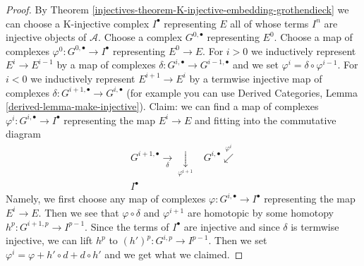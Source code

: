 \begin{proof}

By Theorem \ref{injectives-theorem-K-injective-embedding-grothendieck}
we can choose a K-injective complex $I^\bullet$
representing $E$ all of whose terms $I^n$ are injective
objects of $\mathcal{A}$.
Choose a complex $G^{0, \bullet}$ representing $E^0$.
Choose a map of complexes $\varphi^0 : G^{0, \bullet} \to I^\bullet$
representing $E^0 \to E$.
For $i > 0$ we inductively represent $E^i \to E^{i - 1}$
by a map of complexes
$\delta : G^{i, \bullet} \to G^{i - 1, \bullet}$
and we set $\varphi^i = \delta \circ \varphi^{i - 1}$.
For $i < 0$ we inductively represent $E^{i + 1} \to E^i$
by a termwise injective map of complexes
$\delta : G^{i + 1, \bullet} \to G^{i, \bullet}$
(for example you can use
Derived Categories, Lemma \ref{derived-lemma-make-injective}).
Claim: we can find a map of complexes
$\varphi^i : G^{i, \bullet} \to I^\bullet$
representing the map $E^i \to E$ and
fitting into the commutative diagram
$$
\begin{array}{cc}G^{i + 1, \bullet} \underset{\delta}{\longrightarrow}\underset{\varphi^{i + 1}}{\downarrow} & G^{i, \bullet} \overset{\varphi^i}{\swarrow} \\ I^\bullet & \end{array}
$$
Namely, we first choose any map of complexes
$\varphi : G^{i, \bullet} \to I^\bullet$
representing the map
$E^i \to E$. Then we see that $\varphi \circ \delta$
and $\varphi^{i + 1}$ are homotopic by some homotopy
$h^p : G^{i + 1, p} \to I^{p - 1}$.
Since the terms of
$I^\bullet$ are injective and since $\delta$
is termwise injective, we can lift $h^p$ to
$(h')^p : G^{i, p} \to I^{p - 1}$.
Then we set $\varphi^i = \varphi + h' \circ d + d \circ h'$
and we get what we claimed.


\end{proof}

